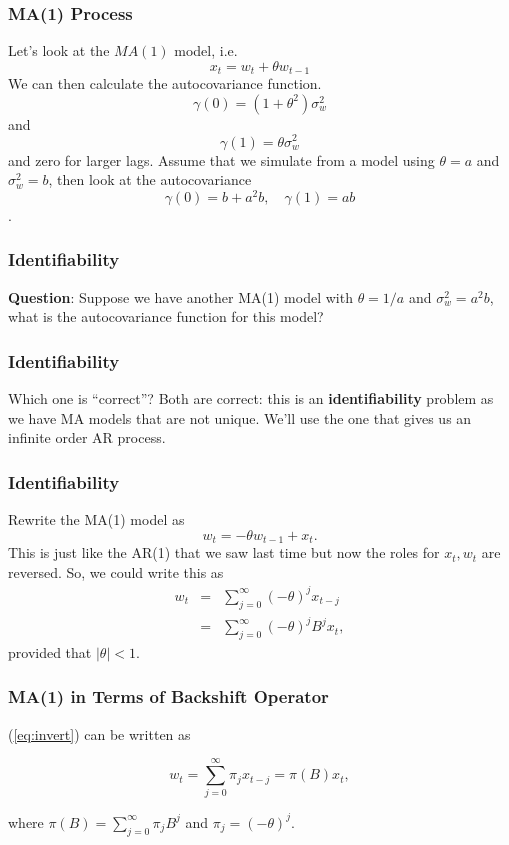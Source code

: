 \documentclass[%
xcolor=pdftex]{beamer}
\begin{document}
\begin{frame}
\frametitle{MA(1) Process}

Let's look at the $MA(1)$ model, i.e.
 $$
 x_t=w_t+ \theta w_{t-1}
 $$
 We can then calculate the autocovariance function.
 $$
 \gamma(0)=(1+\theta^2) \sigma_w^2
 $$
 and
 $$
 \gamma(1)=\theta \sigma_w^2
 $$
 and zero for larger lags.
 Assume that we simulate from a model using $\theta=a$ and $\sigma_w^2=b$, then look at the autocovariance
 $$ \gamma(0)=b+a^2 b, \quad  \gamma(1)=a b $$.

\end{frame}

\begin{frame}
\frametitle{Identifiability}

\textbf{Question}: Suppose we have another MA(1) model with $\theta=1/a$ and $\sigma_w^2=a^2 b$, what is the autocovariance function for this model?

\vspace{40mm}
\end{frame}

\begin{frame}
\frametitle{Identifiability}

 Which one is ``correct''?  Both are correct: this is an \textbf{identifiability} problem as we have MA models that are not unique. We'll use the one that gives us an infinite order AR process.

\end{frame}


\begin{frame}
\frametitle{Identifiability}

 Rewrite the MA(1) model as
 $$
 w_t=-\theta w_{t-1}+x_t.
 $$
 This is just like the AR(1) that we saw last time but now the roles for $x_t, w_t$ are reversed.  So, we could write this as
\begin{eqnarray} \label{eq:invert}
 w_t &=& \sum_{j=0}^\infty (-\theta)^j x_{t-j} \nonumber\\
     &=& \sum_{j=0}^\infty (-\theta)^j B^j x_{t},
\end{eqnarray}
 provided that $|\theta|<1$.

\end{frame}

 \begin{frame}
\frametitle{MA(1) in Terms of Backshift Operator}
(\ref{eq:invert}) can be written as

\begin{equation}
 w_t=\sum_{j=0}^\infty \pi_j x_{t-j} = \pi(B) x_{t},
\end{equation}

where $\pi(B) = \sum_{j=0}^\infty \pi_j B^j$ and $\pi_j = (-\theta)^j$.

\end{frame}
\end{document}
